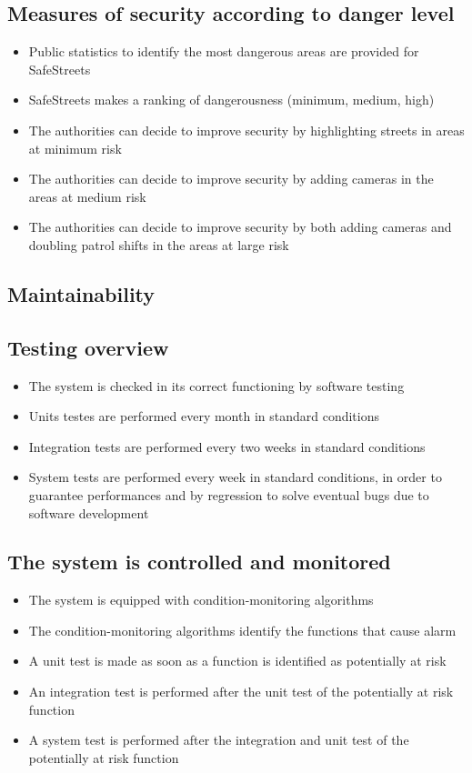 \subsection{Measures of security according to danger level}
\begin{itemize}
  \item Public statistics to identify the most dangerous areas are provided for SafeStreets
  \item SafeStreets makes a ranking of dangerousness (minimum, medium, high)
  \item The authorities can decide to improve security by highlighting streets in areas at minimum risk
  \item The authorities can decide to improve security by adding cameras in the areas at medium risk 
  \item The authorities can decide to improve security by both adding cameras and doubling patrol shifts  in the areas at large risk
\end{itemize}
\endsubsection

\subsection{Maintainability}
\subsection{Testing overview}
\begin{itemize}
  \item The system is checked in its correct functioning by software testing
  \item Units testes are performed every month in standard conditions
  \item Integration tests are performed every two weeks in standard conditions
  \item System tests are performed every week in standard conditions, in order to guarantee performances and by regression to solve eventual bugs due to software development
\end{itemize}

\subsection{The system is controlled and monitored}
\begin{itemize}
  \item The system is equipped with condition-monitoring algorithms 
  \item The condition-monitoring algorithms identify the functions that cause alarm
  \item A unit test is made as soon as a function is identified as potentially at risk
  \item An integration test is performed after the unit test of the potentially at risk function
  \item A system test is performed after the integration and unit test of the potentially at risk function
\end{itemize}


